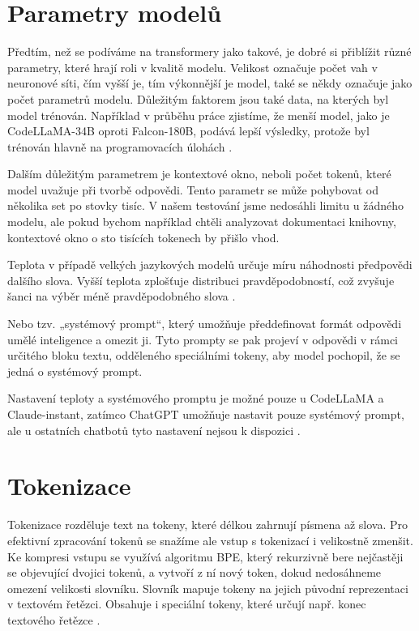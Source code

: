 \documentclass[FM,DP]{tulthesis}
\begin{document}
		\section{Parametry modelů}
		Předtím, než se podíváme na transformery jako takové, je dobré si přiblížit různé parametry, které hrají roli v kvalitě modelu. Velikost označuje počet vah v neuronové síti, čím vyšší je, tím výkonnější je model, také se někdy označuje jako počet parametrů modelu. Důležitým faktorem jsou také data, na kterých byl model trénován. Například v průběhu práce zjistíme, že menší model, jako je CodeLLaMA-34B oproti Falcon-180B, podává lepší výsledky, protože byl trénován hlavně na programovacích úlohách \cite{llm_parameters} \cite{embeddings}.
		
		Dalším důležitým parametrem je kontextové okno, neboli počet tokenů, které model uvažuje při tvorbě odpovědi. Tento parametr se může pohybovat od několika set po stovky tisíc. V našem testování jsme nedosáhli limitu u žádného modelu, ale pokud bychom například chtěli analyzovat dokumentaci knihovny, kontextové okno o sto tisících tokenech by přišlo vhod. 
		
		Teplota v případě velkých jazykových modelů určuje míru náhodnosti předpovědi dalšího slova. Vyšší teplota zplošťuje distribuci pravděpodobností, což zvyšuje šanci na výběr méně pravděpodobného slova \cite{llm_parameters}.
		
		Nebo tzv. „systémový prompt“, který umožňuje předdefinovat formát odpovědi umělé inteligence a omezit ji. Tyto prompty se pak projeví v odpovědi v rámci určitého bloku textu, odděleného speciálními tokeny, aby model pochopil, že se jedná o systémový prompt. 
		
		Nastavení teploty a systémového promptu je možné pouze u CodeLLaMA a Claude-instant, zatímco ChatGPT umožňuje nastavit pouze systémový prompt, ale u ostatních chatbotů tyto nastavení nejsou k dispozici \cite{llm_parameters}.
		
		\section{Tokenizace}
		Tokenizace rozděluje text na tokeny, které délkou zahrnují písmena až slova. Pro efektivní zpracování tokenů se snažíme ale vstup s tokenizací i velikostně zmenšit. Ke kompresi vstupu se využívá algoritmu BPE, který rekurzivně bere nejčastěji se objevující dvojici tokenů, a vytvoří z ní nový token, dokud nedosáhneme omezení velikosti slovníku. Slovník mapuje tokeny na jejich původní reprezentaci v textovém řetězci. Obsahuje i speciální tokeny, které určují např. konec textového řetězce \cite{rothman2021transformers}. 
		
\end{document}
